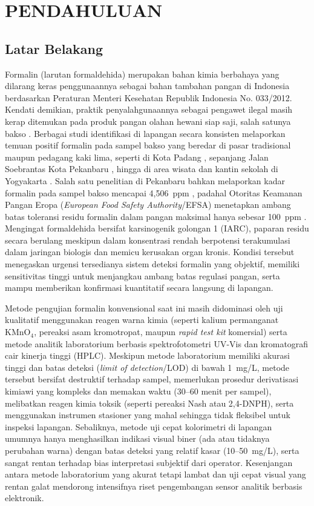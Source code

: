 \chapter{PENDAHULUAN}

\section{Latar Belakang}

Formalin (larutan formaldehida) merupakan bahan kimia berbahaya yang dilarang keras penggunaannya sebagai bahan tambahan pangan di Indonesia berdasarkan Peraturan Menteri Kesehatan Republik Indonesia No. 033/2012. Kendati demikian, praktik penyalahgunaannya sebagai pengawet ilegal masih kerap ditemukan pada produk pangan olahan hewani siap saji, salah satunya bakso \cite{menlhk_formalin,padang_bakso,sosis_efsa}. Berbagai studi identifikasi di lapangan secara konsisten melaporkan temuan positif formalin pada sampel bakso yang beredar di pasar tradisional maupun pedagang kaki lima, seperti di Kota Padang \cite{padang_bakso}, sepanjang Jalan Soebrantas Kota Pekanbaru \cite{pekanbaru_bakso}, hingga di area wisata dan kantin sekolah di Yogyakarta \cite{yogyakarta_bakso}. Salah satu penelitian di Pekanbaru bahkan melaporkan kadar formalin pada sampel bakso mencapai 4,506~ppm \cite{pekanbaru_bakso}, padahal Otoritas Keamanan Pangan Eropa (\textit{European Food Safety Authority}/EFSA) menetapkan ambang batas toleransi residu formalin dalam pangan maksimal hanya sebesar 100~ppm \cite{sosis_efsa}. Mengingat formaldehida bersifat karsinogenik golongan 1 (IARC), paparan residu secara berulang meskipun dalam konsentrasi rendah berpotensi terakumulasi dalam jaringan biologis dan memicu kerusakan organ kronis. Kondisi tersebut menegaskan urgensi tersedianya sistem deteksi formalin yang objektif, memiliki sensitivitas tinggi untuk menjangkau ambang batas regulasi pangan, serta mampu memberikan konfirmasi kuantitatif secara langsung di lapangan.

Metode pengujian formalin konvensional saat ini masih didominasi oleh uji kualitatif menggunakan reagen warna kimia (seperti kalium permanganat $\mathrm{KMnO_4}$, pereaksi asam kromotropat, maupun \textit{rapid test kit} komersial) serta metode analitik laboratorium berbasis spektrofotometri UV-Vis dan kromatografi cair kinerja tinggi (HPLC). Meskipun metode laboratorium memiliki akurasi tinggi dan batas deteksi (\textit{limit of detection}/LOD) di bawah 1~mg/L, metode tersebut bersifat destruktif terhadap sampel, memerlukan prosedur derivatisasi kimiawi yang kompleks dan memakan waktu (30--60 menit per sampel), melibatkan reagen kimia toksik (seperti pereaksi Nash atau 2,4-DNPH), serta menggunakan instrumen stasioner yang mahal sehingga tidak fleksibel untuk inspeksi lapangan. Sebaliknya, metode uji cepat kolorimetri di lapangan umumnya hanya menghasilkan indikasi visual biner (ada atau tidaknya perubahan warna) dengan batas deteksi yang relatif kasar (10--50~mg/L), serta sangat rentan terhadap bias interpretasi subjektif dari operator. Kesenjangan antara metode laboratorium yang akurat tetapi lambat dan uji cepat visual yang rentan galat mendorong intensifnya riset pengembangan sensor analitik berbasis elektronik.

